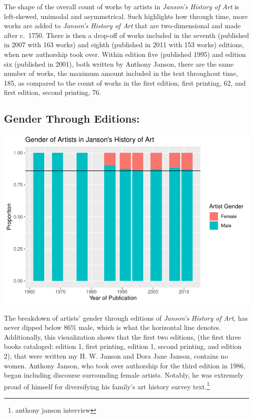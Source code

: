 \documentclass[
  letterpaper,
  DIV=11,
  numbers=noendperiod]{scrreprt}
\begin{document}
The shape of the overall count of works by artists in \emph{Janson's
History of Art} is left-skewed, unimodal and asymmetrical. Such
highlights how through time, more works are added to \emph{Janson's
History of Art} that are two-dimensional and made after c.~1750. There
is then a drop-off of works included in the seventh (published in 2007
with 163 works) and eighth (published in 2011 with 153 works) editions,
when new authorship took over. Within edition five (published 1995) and
edition six (published in 2001), both written by Anthony Janson, there
are the same number of works, the maximum amount included in the text
throughout time, 185, as compared to the count of works in the first
edition, first printing, 62, and first edition, second printing, 76.

\hypertarget{gender-through-editions}{%
\subsection{\texorpdfstring{\textbf{Gender Through
Editions:}}{Gender Through Editions:}}\label{gender-through-editions}}

\includegraphics{Chapter1/Chapter1_files/figure-pdf/jansongenderthroughtime-1.pdf}

The breakdown of artists' gender through editions of \emph{Janson's
History of Art,} has never dipped below 86\% male, which is what the
horizontal line denotes. Additionally, this visualization shows that the
first two editions, (the first three books cataloged: edition 1, first
printing, edition 1, second printing, and edition 2), that were written
my H. W. Janson and Dora Jane Janson, contains no women. Anthony Janson,
who took over authorship for the third edition in 1986, began including
discourse surrounding female artists. Notably, he was extremely proud of
himself for diversifying his family's art history survey
text.\footnote{anthony janson interview}
\end{document}
